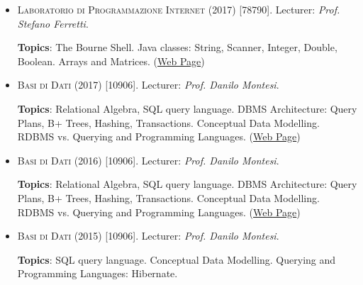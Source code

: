 \begin{itemize}
	\setlength\itemsep{1em}
	\item \textsc{Laboratorio di Programmazione Internet} (2017) [78790]. Lecturer: \textit{Prof. Stefano Ferretti}. 
	
	\textbf{Topics}: The Bourne Shell. Java classes: String, Scanner, Integer, Double, Boolean. Arrays and Matrices. (\href{https://jackbergus.github.io/teaching/LPI17}{Web Page})
	
	
	\item \textsc{Basi di Dati} (2017) [10906]. Lecturer: \textit{Prof. Danilo Montesi}. 
	
	\textbf{Topics}: Relational Algebra, SQL query language. DBMS Architecture: Query Plans, B+ Trees, Hashing, Transactions. Conceptual Data Modelling. RDBMS vs. Querying and Programming Languages. (\href{https://jackbergus.github.io/teaching/BD#lab-sessions-2017}{Web Page})
	
	
	\item \textsc{Basi di Dati} (2016) [10906]. Lecturer: \textit{Prof. Danilo Montesi}. 
	
	\textbf{Topics}: Relational Algebra, SQL query language. DBMS Architecture: Query Plans, B+ Trees, Hashing, Transactions. Conceptual Data Modelling. RDBMS vs. Querying and Programming Languages. (\href{https://jackbergus.github.io/teaching/BD#lab-sessions-2016}{Web Page})
	
	
	\item \textsc{Basi di Dati} (2015) [10906]. Lecturer: \textit{Prof. Danilo Montesi}. 
	
	\textbf{Topics}: SQL query language. Conceptual Data Modelling. Querying and Programming Languages: Hibernate.
\end{itemize}

